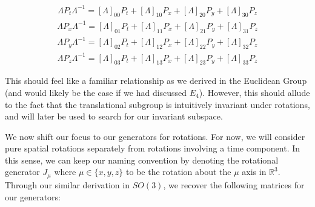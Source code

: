 \documentclass[10pt]{ucthesis}
\newcommand{\R}{\mathbb{R}}
\begin{document}
\begin{equation}
\begin{aligned}
	\Lambda P_t \Lambda^{-1} = [\Lambda]_{00}P_t + [\Lambda]_{10}P_x + [\Lambda]_{20}P_y + [\Lambda]_{30}P_z
\end{aligned}
\end{equation}
\begin{equation}
\begin{aligned}
	\Lambda P_x \Lambda^{-1} = [\Lambda]_{01}P_t + [\Lambda]_{11}P_x + [\Lambda]_{21}P_y + [\Lambda]_{31}P_z
\end{aligned}
\end{equation}
\begin{equation}
\begin{aligned}
	\Lambda P_y \Lambda^{-1} = [\Lambda]_{02}P_t + [\Lambda]_{12}P_x + [\Lambda]_{22}P_y + [\Lambda]_{32}P_z
\end{aligned}
\end{equation}
\begin{equation}
\begin{aligned}
	\Lambda P_z \Lambda^{-1} = [\Lambda]_{03}P_t + [\Lambda]_{13}P_x + [\Lambda]_{23}P_y + [\Lambda]_{33}P_z
\end{aligned}
\end{equation}

This should feel like a familiar relationship as we derived in the Euclidean Group (and would likely be the case if we had discussed $E_4$). However, this should allude to the fact that the translational subgroup is intuitively invariant under rotations, and will later be used to search for our invariant subspace. 

We now shift our focus to our generators for rotations. For now, we will consider pure spatial rotations separately from rotations involving a time component. In this sense, we can keep our naming convention by denoting the rotational generator $J_\mu$ where $\mu\in\{x,y,z\}$ to be the rotation about the $\mu$ axis in $\R^3$. Through our similar derivation in $SO(3)$, we recover the following matrices for our generators:
\end{document}
